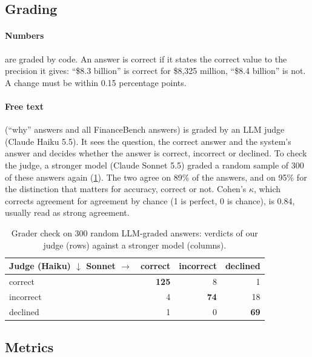\subsection{Grading}
\label{sec:grading}

\paragraph{Numbers} are graded by code. An answer is correct if it states the correct value to the
precision it gives: ``\$8.3 billion'' is correct for \$8,325 million, ``\$8.4 billion'' is not. A
change must be within 0.15 percentage points.

\paragraph{Free text} (``why'' answers and all FinanceBench answers) is graded by an LLM judge
(Claude Haiku 5.5). It sees the question, the correct answer and the system's answer and decides
whether the answer is correct, incorrect or declined. To check the judge, a stronger model (Claude
Sonnet 5.5) graded a random sample of 300 of these answers again (\cref{tab:grader}). The two agree on
89\% of the answers, and on 95\% for the distinction that matters for accuracy, correct or not. Cohen's
$\kappa$, which corrects agreement for agreement by chance (1 is perfect, 0 is chance), is 0.84,
usually read as strong agreement.

\begin{table}[ht]
\centering\small
\begin{tabular}{lrrr}
\toprule
Judge (Haiku) $\downarrow$ \quad Sonnet $\rightarrow$ & correct & incorrect & declined \\
\midrule
correct   & \textbf{125} & 8  & 1 \\
incorrect & 4   & \textbf{74} & 18 \\
declined  & 1   & 0  & \textbf{69} \\
\bottomrule
\end{tabular}
\caption{Grader check on 300 random LLM-graded answers: verdicts of our judge (rows) against a
stronger model (columns).}
\label{tab:grader}
\end{table}

\subsection{Metrics}
\label{sec:metrics}

